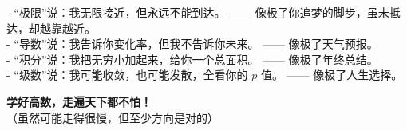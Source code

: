 \documentclass[12pt,a4paper]{article}
\begin{document}
\vspace{1em}
\begin{humorbox}
- “极限”说：我无限接近，但永远不能到达。 —— 像极了你追梦的脚步，虽未抵达，却越靠越近。\\
- “导数”说：我告诉你变化率，但我不告诉你未来。 —— 像极了天气预报。\\
- “积分”说：我把无穷小加起来，给你一个总面积。 —— 像极了年终总结。\\
- “级数”说：我可能收敛，也可能发散，全看你的 $p$ 值。 —— 像极了人生选择。
\end{humorbox}

\vspace{1em}
\begin{center}
\large\textcolor{DeepBlue}{\textbf{学好高数，走遍天下都不怕！}}\\
\small\textcolor{Sunshine}{（虽然可能走得很慢，但至少方向是对的）}
\end{center}
\end{document}
